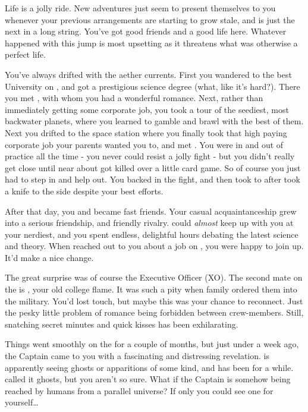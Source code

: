 \documentclass[char]{TMFHope}
\begin{document}
\name{\cSci{}}

Life is a jolly ride. New adventures just seem to present themselves to you whenever your previous arrangements are starting to grow stale, and \pNew{} is just the next in a long string. You've got good friends and a good life here. Whatever happened with this jump is most upsetting as it threatens what was otherwise a perfect life.

You've always drifted with the aether currents. First you wandered to the best University on \pHome{}, and got a prestigious science degree (what, like it's hard?). There you met \cXO{\full}, with whom you had a wonderful romance. Next, rather than immediately getting some corporate job, you took a tour of the seediest, most backwater \pEdge{} planets, where you learned to gamble and brawl with the best of them. Next you drifted to the space station where you finally took that high paying corporate job your parents wanted you to, and met \cMed{\full}. You were in and out of \cMed{\their} practice all the time - you never could resist a jolly fight - but you didn't really get close until \cCap{\full} near about got \cCap{\themself} killed over a little card game. So of course you just had to step in and help \cCap{\them} out. You backed \cCap{} in the fight, and then took \cCap{\them} to \cMed{} after \cCap{\they} took a knife to the side despite your best efforts. 

After that day, you and \cMed{} became fast friends. Your casual acquaintanceship grew into a serious friendship, and friendly rivalry. \cMed{} could \emph{almost} keep up with you at your nerdiest, and you spent endless, delightful hours debating the latest science and theory. When \cCap{} reached out to you about a job on \pNew{}, you were happy to join up. It'd make a nice change.

The great surprise was of course the Executive Officer (XO). The second mate on the \pNew{} is \cXO{}, your old college flame. It was such a pity when \cXO{\their} family ordered them into the military. You'd lost touch, but maybe this was your chance to reconnect. Just the pesky little problem of romance being forbidden between crew-members. Still, snatching secret minutes and quick kisses has been exhilarating.

Things went smoothly on the \pNew{} for a couple of months, but just under a week ago, the Captain came to you with a fascinating and distressing revelation. \cCap{} is apparently seeing ghosts or apparitions of some kind, and has been for a while. \cCap{\They} called it ghosts, but you aren't so sure. What if the Captain is somehow being reached by humans from a parallel universe? If only you could see one for yourself\ldots
\end{document}
